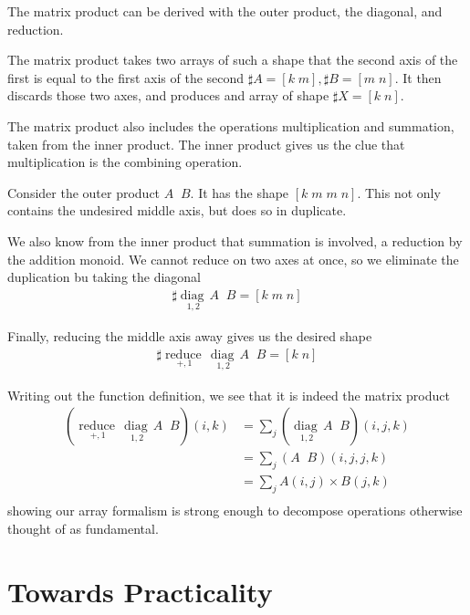 \documentclass{DIKU-report-variant}
\newcommand\mrm[1]{\mathrm{#1}}
\newcommand\brm[1]{\bm{\mrm{#1}}}
\newcommand\reduce{\operatorname*{\brm{reduce}\,}}
\newcommand\diag{\operatorname*{\brm{diag}\,}}
\newcommand\oprodby[1]{\mathop{\operatorname*{\,\brm{by}}_{#1}}}
\begin{document}
\begin{example}
  \label{ex:matrix-product}
  The matrix product can be derived with the outer product,
  the diagonal, and reduction.

  The matrix product takes two arrays of such a shape that the
  second axis of the first is equal to the first axis of the second
  \(\sharp A = [k\; m], \sharp B = [m\; n]\). It then discards those
  two axes, and produces and array of shape \(\sharp X = [k\; n]\).

  The matrix product also includes the operations multiplication and
  summation, taken from the inner product. The inner product gives us
  the clue that multiplication is the combining operation.

  Consider the outer product \(A \oprodby\times B\). It has the
  shape \([k\;m\;m\;n]\). This not only contains the undesired middle axis,
  but does so in duplicate.

  We also know from the inner product that summation is involved, a reduction
  by the addition monoid. We cannot reduce on two axes at once, so we eliminate
  the duplication bu taking the diagonal
  \begin{align*}
    \sharp \diag_{1,2} A \oprodby\times B = [k\;m\;n]
  \end{align*}

  Finally, reducing the middle axis away gives us the desired shape
  \begin{align*}
  \sharp \reduce_{+,1} \diag_{1,2} A \oprodby\times B = [k\;n]
  \end{align*}

  Writing out the function definition, we see that it is indeed the matrix product
  \begin{align*}
    \left(\reduce_{+,1} \diag_{1,2} A \oprodby\times B\right) (i, k)
    &= \sum_{j} \left(\diag_{1,2} A \oprodby\times B\right) (i, j, k) \\
    &= \sum_{j} \left(A \oprodby\times B\right) (i, j, j, k) \\
    &= \sum_{j} A(i, j) \times B(j, k) \\
  \end{align*}
  showing our array formalism is strong enough to decompose operations
  otherwise thought of as fundamental.
\end{example}

\chapter{Towards Practicality}
\end{document}
